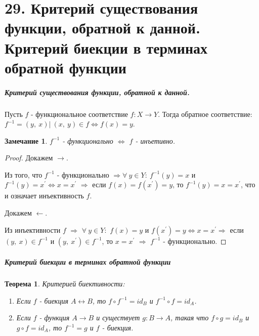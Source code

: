 \documentclass[a4paper,12pt]{article}
\newtheorem*{Note}{Замечание}
\newtheorem*{theorem}{Теорема}
\newcommand{\p}{^{\prime}}
\begin{document}
        \section*{29. Критерий существования функции, обратной к данной. Критерий биекции в терминах обратной функции}

        \subparagraph{Критерий существования функции, обратной к данной.}
        Пусть $f$ - функциональное соответствие $f:X \rightarrow Y$. Тогда обратное соответствие: $f^{-1} = {(y,\ x)|\ (x,\ y) \in f \Leftrightarrow f(x) = y}$.

        \begin{Note} $f^{-1}$ - функционально $\Leftrightarrow$ $f$ - инъетивно.
        \end{Note}

        \begin{proof}

        Докажем $\rightarrow$. 

        Из того, что $f^{-1}$ - функционально $\Rightarrow \forall\ y \in Y:\ f^{-1}(y) = x$ и $f^{-1}(y) = x\p \Leftrightarrow x = x\p$ $\Rightarrow$ если $f(x) = f(x\p) = y$, то $f^{-1}(y) = x = x\p$, что и означает инъективность $f$. 

        Докажем $\leftarrow$.

        Из инъективности $f$ $\Rightarrow$ $\forall\ y \in Y:$  $f(x) = y$ и $f(x\p) = y \Leftrightarrow x = x\p \Rightarrow$ если $(y,\ x) \in f^{-1}$ и $(y,\ x\p) \in f^{-1}$, то $x = x\p$ $\Rightarrow$ $f^{-1}$ - функционально.
        \end{proof} 

        \subparagraph{Критерий биекции в терминах обратной функции}
        \begin{theorem} Критерией биективности:
            \begin{enumerate}
                \item Если $f$ - биекция $A \leftrightarrow B$, 
                то $f \circ f^{-1} = id_B$ и
                            $f^{-1} \circ f = id_A$.       
                \item Если $f$ - функция $A \rightarrow B$ и существует $g: B \rightarrow A$, такая что $f \circ g = id_B$ и $g \circ f = id_A$, то $f^{-1} = g$ и $f$ - биекция.    
            \end{enumerate} 
        \end{theorem}
\end{document}
